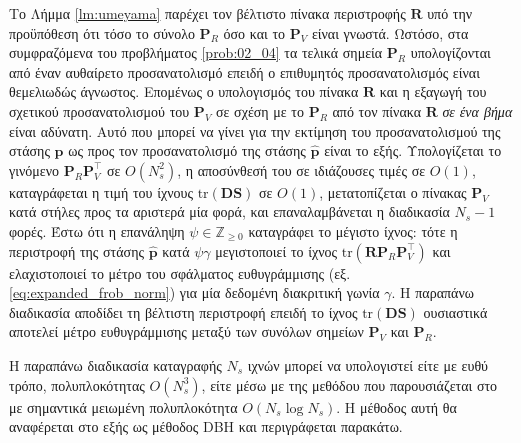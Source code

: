 Το Λήμμα \ref{lm:umeyama} παρέχει τον βέλτιστο πίνακα περιστροφής $\bm{R}$ υπό
την προϋπόθεση ότι τόσο το σύνολο $\bm{P}_R$ όσο και το $\bm{P}_V$ είναι
γνωστά.  Ωστόσο, στα συμφραζόμενα του προβλήματος \ref{prob:02_04} τα τελικά
σημεία $\bm{P}_R$ υπολογίζονται από έναν αυθαίρετο προσανατολισμό επειδή ο
επιθυμητός προσανατολισμός είναι θεμελιωδώς άγνωστος. Επομένως ο υπολογισμός
του πίνακα $\bm{R}$ και η εξαγωγή  του σχετικού προσανατολισμού του $\bm{P}_V$
σε σχέση με το $\bm{P}_R$ από τον πίνακα $\bm{R}$ \textit{σε ένα βήμα} είναι
αδύνατη. Αυτό που μπορεί να γίνει για την εκτίμηση του προσανατολισμού της
στάσης $\bm{p}$ ως προς τον προσανατολισμό της στάσης $\hat{\bm{p}}$ είναι το
εξής. Υπολογίζεται το γινόμενο $\bm{P}_R \bm{P}_V^\top$ σε $O(N_s^2)$, η
αποσύνθεσή του σε ιδιάζουσες τιμές σε $O(1)$, καταγράφεται η τιμή του ίχνους
$\text{tr}(\bm{D}\bm{S})$ σε $O(1)$, μετατοπίζεται ο πίνακας $\bm{P}_V$ κατά
στήλες προς τα αριστερά μία φορά, και επαναλαμβάνεται η διαδικασία $N_s-1$
φορές. Έστω ότι η επανάληψη $\psi \in \mathbb{Z}_{\geq 0}$ καταγράφει το
μέγιστο ίχνος: τότε η περιστροφή της στάσης $\hat{\bm{p}}$ κατά $\psi \gamma$
μεγιστοποιεί το ίχνος $\text{tr}(\bm{R} \bm{P}_R \bm{P}_V^\top)$ και
ελαχιστοποιεί το μέτρο του σφάλματος ευθυγράμμισης
(εξ. \ref{eq:expanded_frob_norm}) για μία δεδομένη διακριτική γωνία $\gamma$. Η
παραπάνω διαδικασία αποδίδει τη βέλτιστη περιστροφή επειδή το ίχνος
$\text{tr}(\bm{D}\bm{S})$ ουσιαστικά αποτελεί μέτρο ευθυγράμμισης μεταξύ των
συνόλων σημείων $\bm{P}_V$ και $\bm{P}_R$.

Η παραπάνω διαδικασία καταγραφής $N_s$ ιχνών μπορεί να υπολογιστεί είτε με ευθύ
τρόπο, πολυπλοκότητας $O(N_s^3)$, είτε μέσω με της μεθόδου που παρουσιάζεται
στο \cite{Dogan2015} με σημαντικά μειωμένη πολυπλοκότητα $O(N_s \log N_s)$.  Η
μέθοδος αυτή θα αναφέρεται στο εξής ως μέθοδος DBH και περιγράφεται παρακάτω.


